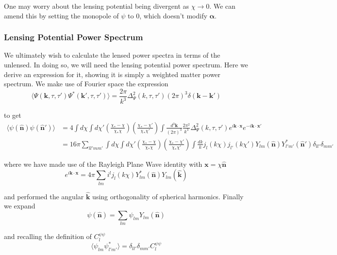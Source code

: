 \documentclass[a4paper,10pt]{article}
\renewcommand{\v}[1]{\mathbf{#1}}
\newcommand{\fint}[1]{\int \frac{d^3 \v{#1}}{(2\pi)^3}}
\newcommand{\unit}[1]{\hat{\v{#1}}}
\begin{document}
One may worry about the lensing potential being divergent as $\chi \rightarrow 0$. We can amend this by setting the monopole of $\psi$ to 0, which doesn't modify $\v{\alpha}$. 

\subsubsection{Lensing Potential Power Spectrum}

We ultimately wish to calculate the lensed power spectra in terms of the unlensed. In doing so, we will need the lensing potential power spectrum. Here we derive an expression for it, showing it is simply a weighted matter power spectrum. We make use of Fourier space the expression
\begin{equation}
\langle \Psi(\v{k},\tau,\tau')\Psi^*(\v{k}',\tau,\tau')\rangle=\frac{2\pi}{k^3}\Delta^2_\Psi(k,\tau,\tau')(2\pi)^3\delta(\v{k}-\v{k}')
\end{equation}

to get 
\begin{equation}\begin{split}
\langle \psi(\unit{n})\psi(\unit{n}') \rangle &= 4\int d\chi \int d\chi'(\frac{\chi_*-\chi}{\chi_*\chi})(\frac{\chi_*-\chi'}{\chi_*\chi'})\fint{k}\frac{2\pi^2}{k^3}\Delta^2_\Psi(k,\tau,\tau')e^{i\v{k}\cdot\v{x}}e^{-i\v{k}\cdot\v{x'}}\\
&= 16\pi \sum_{ll'mm'}\int d\chi \int d\chi'(\frac{\chi_*-\chi}{\chi_*\chi})(\frac{\chi_*-\chi'}{\chi_*\chi'})\int \frac{dk}{k}j_l(k\chi)j_{l'}(k\chi')Y_{lm}(\unit{n})Y^*_{l'm'}(\unit{n}')\delta_{ll'}\delta_{mm'}
\end{split}\end{equation}

where we have made use of the Rayleigh Plane Wave identity with $\v{x}=\chi\unit{n}$
\begin{equation}
e^{i\v{k}\cdot\v{x}} = 4\pi\sum_{lm}i^lj_l(k\chi)Y_{lm}^*(\unit{n})Y_{lm}(\unit{k})
\end{equation}

and performed the angular $\unit{k}$ using orthogonality of spherical harmonics. Finally we expand
\begin{equation}
\psi(\unit{n}) = \sum_{lm}\psi_{lm}Y_{lm}(\unit{n})
\end{equation}

and recalling the definition of $C_l^{\psi\psi}$
\begin{equation}
\langle \psi_{lm}\psi_{l'm'}^* \rangle = \delta_{ll'}\delta_{mm'}C_l^{\psi\psi}
\end{equation}
\end{document}

